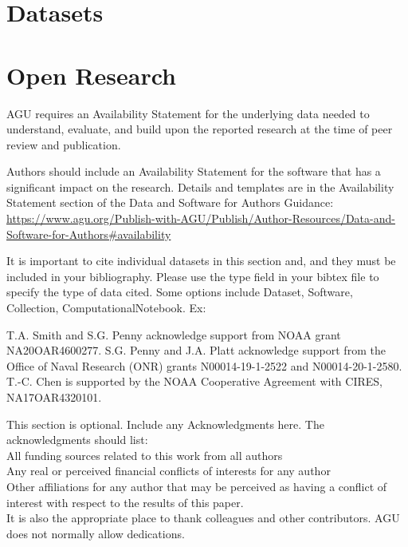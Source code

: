 \documentclass[draft]{agujournal2019}
\begin{document}
%
%


\section{Datasets}
\label{sec:datasets}





\newpage





\appendix




\newpage
\section{Open Research}
AGU requires an Availability Statement for the underlying data needed to understand, evaluate, and build upon the reported research at the time of peer review and publication.

Authors should include an Availability Statement for the software that has a significant impact on the research. Details and templates are in the Availability Statement section of the Data and Software for Authors Guidance: \url{https://www.agu.org/Publish-with-AGU/Publish/Author-Resources/Data-and-Software-for-Authors#availability}

It is important to cite individual datasets in this section and, and they must be included in your bibliography. Please use the type field in your bibtex file to specify the type of data cited. Some options include Dataset, Software, Collection, ComputationalNotebook. Ex:


\acknowledgments

T.A. Smith and S.G. Penny acknowledge support from NOAA grant NA20OAR4600277. S.G. Penny and J.A. Platt acknowledge support from the Office of Naval Research (ONR) grants N00014-19-1-2522 and N00014-20-1-2580. T.-C. Chen is supported by the NOAA Cooperative Agreement with CIRES, NA17OAR4320101.

This section is optional. Include any Acknowledgments here.
The acknowledgments should list:\\
All funding sources related to this work from all authors\\
Any real or perceived financial conflicts of interests for any author\\
Other affiliations for any author that may be perceived as having a conflict of interest with respect to the results of this paper.\\
It is also the appropriate place to thank colleagues and other contributors. AGU does not normally allow dedications.





%

\end{document}
